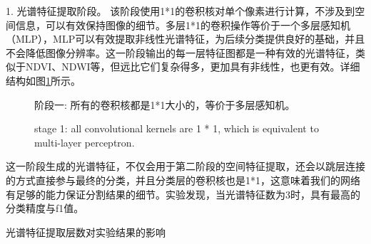 \documentclass[10pt]{ctexart}
\begin{document}
\begin{multicols}{2} 
1. 光谱特征提取阶段。 该阶段使用1*1的卷积核对单个像素进行计算，不涉及到空间信息，可以有效保持图像的细节。多层1*1的卷积操作等价于一个多层感知机（MLP），MLP可以有效提取非线性光谱特征，为后续分类提供良好的基础，并且不会降低图像分辨率。这一阶段输出的每一层特征图都是一种有效的光谱特征，类似于NDVI、NDWI等，但远比它们复杂得多，更加具有非线性，也更有效。详细结构如图\ref{pic:straight}所示。

\begin{figure}[H]
    \centering
    \caption[]{阶段一: 所有的卷积核都是1*1大小的，等价于多层感知机。}
    \addtocounter{figure}{-1}
    \vspace{-5pt}
    \renewcommand{\figurename}{Fig}
    \caption{stage 1: all convolutional kernels are 1 * 1, which is equivalent to multi-layer perceptron.}
    \renewcommand{\figurename}{图}
    \label{pic:straight}
\end{figure}

这一阶段生成的光谱特征，不仅会用于第二阶段的空间特征提取，还会以跳层连接的方式直接参与最终的分类，并且分类层的卷积核也是1*1，这意味着我们的网络有足够的能力保证分割结果的细节。实验发现，当光谱特征数为3时，具有最高的分类精度与f1值。

\begin{table}[H]
    \caption{光谱特征提取层数对实验结果的影响}
    \addtocounter{table}{-1}
    \vspace{-5pt}
    \renewcommand{\tablename}{Tab}
    \caption{Influence of the number of spectral feature extraction layers on experimental results}
    \renewcommand{\tablename}{表}
    \vspace{5pt}

    \centering
    

\end{table}
\end{multicols}
\end{document}
